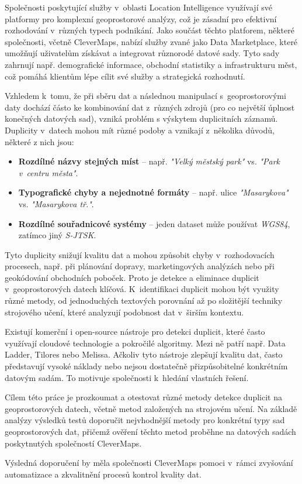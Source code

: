 Společnosti poskytující služby v~oblasti Location Intelligence využívají své platformy pro komplexní geoprostorové analýzy, což je zásadní pro efektivní rozhodování v~různých typech podnikání. Jako součást těchto platforem, některé společnosti, včetně CleverMaps, nabízí služby zvané jako Data Marketplace, které umožňují uživatelům získávat a integrovat různorodé datové sady. Tyto sady zahrnují např. demografické informace, obchodní statistiky a infrastrukturu měst, což pomáhá klientům lépe cílit své služby a strategická rozhodnutí. \cite{clevermaps_location_2024}

Vzhledem k~tomu, že při sběru dat a následnou manipulací s~geoprostorovými daty dochází částo ke kombinování dat z~různých zdrojů (pro co největší úplnost konečných datových sad), vzniká problém s výskytem duplicitních záznamů. Duplicity v~datech mohou mít různé podoby a vznikají z~několika důvodů, některé z nich jsou:

\begin{itemize}
  \item \textbf{Rozdílné názvy stejných míst} – např. \textit{"Velký městský park"} vs. \textit{"Park v~centru města"}.
  \item \textbf{Typografické chyby a nejednotné formáty} – např. ulice \textit{"Masarykova"} vs. \textit{"Masarykova tř."}.
  \item \textbf{Rozdílné souřadnicové systémy} – jeden dataset může používat \textit{WGS84}, zatímco jiný \textit{S-JTSK}.
\end{itemize}

Tyto duplicity snižují kvalitu dat a mohou způsobit chyby v~rozhodovacích procesech, např. při plánování dopravy, marketingových analýzách nebo při geokódování obchodních poboček. Proto je detekce a eliminace duplicit v~geoprostorových datech klíčová. K~identifikaci duplicit mohou být využity různé metody, od jednoduchých textových porovnání až po složitější techniky strojového učení, které analyzují podobnost dat v~širším kontextu. \cite{nauman_introduction_2022, christen_data_2012}

Existují komerční i open-source nástroje pro detekci duplicit, které často využívají cloudové technologie a pokročilé algoritmy. Mezi ně patří např. Data Ladder, Tilores nebo Melissa. Ačkoliv tyto nástroje zlepšují kvalitu dat, často představují vysoké náklady nebo nejsou dostatečně přizpůsobitelné konkrétním datovým sadám. To motivuje společnosti k~hledání vlastních řešení. \cite{christen_data_2012}

Cílem této práce je prozkoumat a otestovat různé metody detekce duplicit na geoprostorových datech, včetně metod založených na strojovém učení. Na základě analýzy výsledků testů doporučit nejvhodnější metody pro konkrétní typy sad geoprostorových dat, přičemž ověření těchto metod proběhne na datových sadách poskytnutých společností CleverMaps.

Výsledná doporučení by měla společnosti CleverMaps pomoci v~rámci zvyšování automatizace a zkvalitnění procesů kontrol kvality dat.
